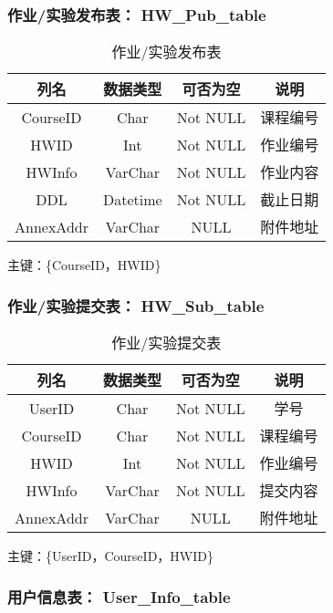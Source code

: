 \subsubsection{作业/实验发布表： HW\_Pub\_table}

\begin{table}[htbp]
\centering
\caption{作业/实验发布表} \label{tab:classification}
\begin{tabular}{|c|c|c|c|}
    \hline
    列名 & 数据类型 & 可否为空 & 说明 \\
    \hline
    CourseID & Char & Not NULL & 课程编号 \\
    \hline
    HWID & Int & Not NULL & 作业编号 \\
    \hline
    HWInfo & VarChar & Not NULL & 作业内容 \\
    \hline
    DDL & Datetime & Not NULL & 截止日期 \\
    \hline
    AnnexAddr & VarChar & NULL & 附件地址 \\
    \hline
\end{tabular}
\end{table}
主键：\{CourseID，HWID\}


\subsubsection{作业/实验提交表： HW\_Sub\_table}

\begin{table}[htbp]
\centering
\caption{作业/实验提交表} \label{tab:classification}
\begin{tabular}{|c|c|c|c|}
    \hline
    列名 & 数据类型 & 可否为空 & 说明 \\
	\hline
    UserID & Char & Not NULL & 学号 \\
    \hline
    CourseID & Char & Not NULL & 课程编号 \\
    \hline
    HWID & Int & Not NULL & 作业编号 \\
    \hline
    HWInfo & VarChar & Not NULL & 提交内容 \\
    \hline
    AnnexAddr & VarChar & NULL & 附件地址 \\
    \hline
\end{tabular}
\end{table}
主键：\{UserID，CourseID，HWID\}


\subsubsection{用户信息表： User\_Info\_table}

